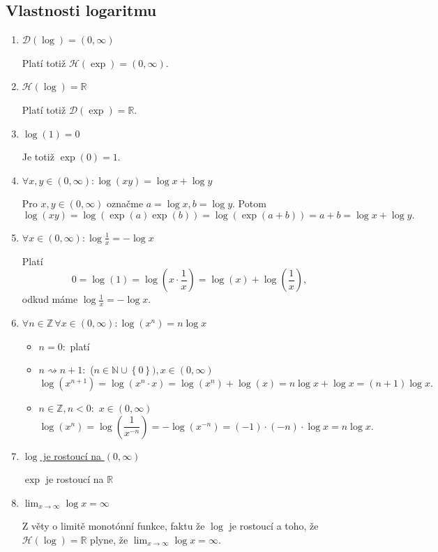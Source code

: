 \subsection{Vlastnosti logaritmu}
\begin{enumerate}
	\item[(L1)] \underline{$\mathcal D(\log)=(0,\infty)$}
	\par Platí totiž $\mathcal H(\exp) = (0,\infty)$.
	\item[(L2)] \underline{$\mathcal H(\log)=\mathbb R $}
	\par Platí totiž $\mathcal D(\exp)=\mathbb R $.
	\item[(L3)] \underline{$\log(1)=0$}
	\par Je totiž $\exp(0)=1$.
	\item[(L4)] \underline{$\forall x,y \in(0,\infty):\log(xy)=\log x + \log y$}
	\par Pro $x,y\in (0,\infty)$ označme $a=\log x, b = \log y$. Potom
	$$
	    \log(xy)=\log(\exp(a)\exp(b))=\log(\exp(a+b))=a+b=\log x + \log y.
	$$
	\item[(L5)] \underline{$\forall x \in (0,\infty): \log \frac{1}{x} = - \log x$}
	\par Platí
	$$
	    0=\log (1) = \log \left( x\cdot \frac{1}{x} \right ) = \log (x)+ \log \left( \frac{1}{x} \right ),
	$$
	odkud máme $\log \frac{1}{x}=-\log x$.
	\item[(L6)] \underline{$\forall n \in \mathbb Z  \, \forall x \in (0,\infty):\log (x^n)=n\log x$}
	\begin{itemize}
		\item $n=0:$ platí
		\item $n \rightsquigarrow n+1:$ ($n\in \mathbb N \cup \left \{ 0 \right \}) , x \in (0,\infty)$
		$$
		    \log(x^{n+1})=\log(x^n\cdot x) = \log(x^n)+ \log (x) = n\log x + \log x = (n+1)\log x.
		$$
		\item $n\in \mathbb Z , n < 0:$ $x \in (0,\infty)$
		$$
		    \log(x^n)=\log \left( \frac{1}{x^{-n}} \right ) = -\log (x^{-n}) = (-1) \cdot (-n)\cdot \log x=n\log x.
		$$
	\end{itemize}
	\item[(L7)] \underline{$\log$ je rostoucí na $(0,\infty)$}
	\par $\exp$ je rostoucí na $\mathbb R $
	\item[(L8)] \underline{$\lim_{x \to \infty} \log x=\infty$}
	\par Z věty o limitě monotónní funkce, faktu že $\log $ je rostoucí a toho, že
	$\mathcal H(\log) = \mathbb R $ plyne, že $\lim_{x \to \infty} \log x = \infty$.

\end{enumerate}
